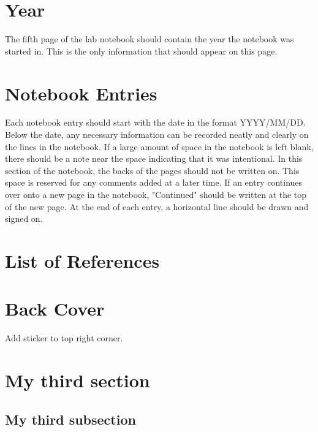\documentclass[11pt, oneside]{article}   	%
\begin{document}
\section{Year}

The fifth page of the lab notebook should contain the year the notebook was started in. This is the only information that should appear on this page.

\section{Notebook Entries}

Each notebook entry should start with the date in the format YYYY/MM/DD. Below the date, any necessary information can be recorded neatly and clearly on the lines in the notebook. If a large amount of space in the notebook is left blank, there should be a note near the space indicating that it was intentional. In this section of the notebook, the backs of the pages should not be written on. This space is reserved for any comments added at a later time. If an entry continues over onto a new page in the notebook, "Continued" should be written at the top of the new page. At the end of each entry, a horizontal line should be drawn and signed on. 

\section{List of References}
\section{Back Cover}	
Add sticker to top right corner.				%



\section{My third section}				%
\subsection{My third subsection}		%





\newpage							%

\end{document}

